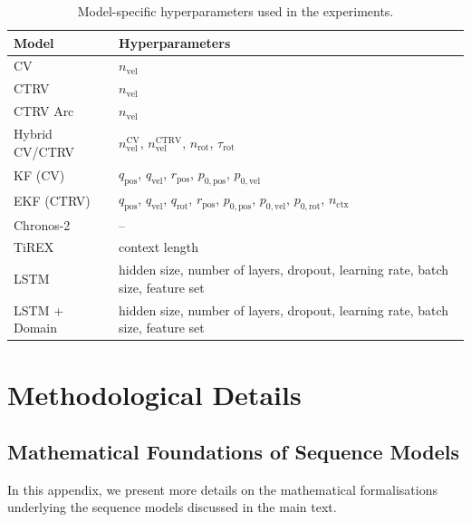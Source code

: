     \begin{table}[t] %
    \centering
    \caption[Model-specific Hyperparameters]{Model-specific hyperparameters used in the experiments.}
    \label{tab:model_hyperparameters}
    \begin{tabular}{ll}
    \toprule
    \textbf{Model} & \textbf{Hyperparameters} \\
    \midrule
    CV & $n_\text{vel}$ \\
    CTRV & $n_\text{vel}$ \\
    CTRV Arc & $n_\text{vel}$ \\
    Hybrid CV/CTRV & $n_\text{vel}^\text{CV}$, $n_\text{vel}^\text{CTRV}$, $n_\text{rot}$, $\tau_\text{rot}$ \\
    KF (CV) & $q_\text{pos}$, $q_\text{vel}$, $r_\text{pos}$, $p_{0,\text{pos}}$, $p_{0,\text{vel}}$ \\
    EKF (CTRV) & $q_\text{pos}$, $q_\text{vel}$, $q_\text{rot}$, $r_\text{pos}$, $p_{0,\text{pos}}$, $p_{0,\text{vel}}$, $p_{0,\text{rot}}$, $n_\text{ctx}$ \\
    Chronos-2 & -- \\
    TiREX & context length \\
    LSTM & hidden size, number of layers, dropout, learning rate, batch size, feature set \\
    LSTM + Domain & hidden size, number of layers, dropout, learning rate, batch size, feature set \\
    \bottomrule
    \end{tabular}
    \end{table} 






















\chapter{Methodological Details} 
\label{chap:appendixderivations}

\section{Mathematical Foundations of Sequence Models}
\label{appx: mathfoundations}
In this appendix, we present more details on the mathematical formalisations underlying the sequence models discussed in the main text.
